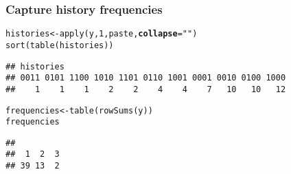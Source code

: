 \documentclass[color=usenames,dvipsnames]{beamer}\usepackage[]{graphicx}\usepackage[]{color}
\makeatletter
\newcommand{\hlnum}[1]{\textcolor[rgb]{0.69,0.494,0}{#1}}%
\newcommand{\hlstr}[1]{\textcolor[rgb]{0.749,0.012,0.012}{#1}}%
\newcommand{\hlstd}[1]{\textcolor[rgb]{0,0,0}{#1}}%
\newcommand{\hlkwb}[1]{\textcolor[rgb]{0,0.341,0.682}{#1}}%
\newcommand{\hlkwc}[1]{\textcolor[rgb]{0,0,0}{\textbf{#1}}}%
\newcommand{\hlkwd}[1]{\textcolor[rgb]{0.004,0.004,0.506}{#1}}%
\newenvironment{kframe}{%
 \def\at@end@of@kframe{}%
 \ifinner\ifhmode%
  \def\at@end@of@kframe{\end{minipage}}%
  \begin{minipage}{\columnwidth}%
 \fi\fi%
 \def\FrameCommand##1{\hskip\@totalleftmargin \hskip-\fboxsep
 \colorbox{shadecolor}{##1}\hskip-\fboxsep
     \hskip-\linewidth \hskip-\@totalleftmargin \hskip\columnwidth}%
 \MakeFramed {\advance\hsize-\width
   \@totalleftmargin\z@ \linewidth\hsize
   \@setminipage}}%
 {\par\unskip\endMakeFramed%
 \at@end@of@kframe}
\newenvironment{knitrout}{}{} %
\makeatother
\begin{document}
\begin{frame}[fragile]
  \frametitle{Capture history frequencies}
  \centering
\begin{knitrout}\scriptsize
{}\color{fgcolor}\begin{kframe}
\begin{alltt}
\hlstd{histories} \hlkwb{<-} \hlkwd{apply}\hlstd{(y,} \hlnum{1}\hlstd{, paste,} \hlkwc{collapse}\hlstd{=}\hlstr{""}\hlstd{)}
\hlkwd{sort}\hlstd{(}\hlkwd{table}\hlstd{(histories))}
\end{alltt}
\begin{verbatim}
## histories
## 0011 0101 1100 1010 1101 0110 1001 0001 0010 0100 1000 
##    1    1    1    2    2    4    4    7   10   10   12
\end{verbatim}
\end{kframe}
\end{knitrout}
\begin{knitrout}\scriptsize
{}\color{fgcolor}\begin{kframe}
\begin{alltt}
\hlstd{frequencies} \hlkwb{<-} \hlkwd{table}\hlstd{(}\hlkwd{rowSums}\hlstd{(y))}
\hlstd{frequencies}
\end{alltt}
\begin{verbatim}
## 
##  1  2  3 
## 39 13  2
\end{verbatim}
\end{kframe}
\end{knitrout}
\end{frame}
\end{document}
